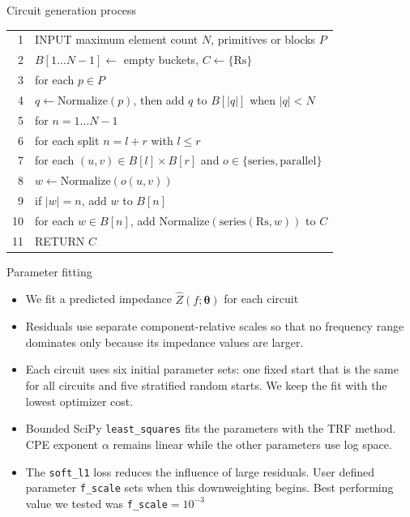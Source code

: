 \documentclass[aspectratio=169,12pt]{beamer}
\begin{document}
\begin{frame}{Circuit generation process}
  \footnotesize
  \renewcommand{\arraystretch}{1.10}
  \begin{tabularx}{\textwidth}{@{}r>{\ttfamily\raggedright\arraybackslash}X@{}}
     1 & INPUT maximum element count $N$, primitives or blocks $P$ \\
     2 & $B[1\ldots N-1] \gets$ empty buckets, $C \gets \{\mathrm{Rs}\}$ \\
     3 & for each $p \in P$ \\
     4 & \hspace*{1em}$q \gets \mathrm{Normalize}(p)$, then add $q$ to $B[|q|]$ when $|q| < N$ \\
     5 & for $n = 1\ldots N-1$ \\
     6 & \hspace*{1em}for each split $n = l + r$ with $l \le r$ \\
     7 & \hspace*{2em}for each $(u,v) \in B[l] \times B[r]$ and $o \in \{\mathrm{series},\mathrm{parallel}\}$ \\
     8 & \hspace*{3em}$w \gets \mathrm{Normalize}(o(u,v))$ \\
     9 & \hspace*{3em}if $|w| = n$, add $w$ to $B[n]$ \\
    10 & \hspace*{1em}for each $w \in B[n]$, add $\mathrm{Normalize}(\mathrm{series}(\mathrm{Rs},w))$ to $C$ \\
    11 & RETURN $C$ \\
  \end{tabularx}
\end{frame}

\begin{frame}{Parameter fitting}
  \begin{itemize}
    \setlength{\itemsep}{0.65em}
    \item We fit a predicted impedance $\widehat{Z}(f;\boldsymbol{\theta})$ for each circuit 
    \item Residuals use separate component-relative scales so that no frequency range
      dominates only because its impedance values are larger.
    \item Each circuit uses six initial parameter sets: one fixed start that is the same for all circuits
    and five stratified random starts. We keep the fit with the lowest optimizer cost.
    \item Bounded SciPy \texttt{least\_squares} fits the parameters with the TRF method.
      CPE exponent $\alpha$ remains linear while the other parameters use log space.
    \item The \texttt{soft\_l1} loss reduces the influence of large residuals.
      User defined parameter \texttt{f\_scale} sets when this downweighting begins.
      Best performing value we tested was \texttt{f\_scale}$=10^{-3}$
  \end{itemize}
\end{frame}
\end{document}
